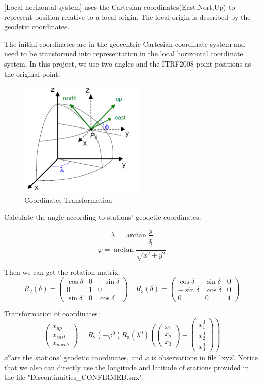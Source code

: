 \documentclass{article}
\begin{document}
[Local horizontal system] uses the Cartesian coordinates(East,Nort,Up) to represent position relative to a local origin. The local origin is described by the geodetic coordinates.

The initial coordinates are in the geocentric Cartesian coordinate system and need to be transformed into representation in the local horizontal coordinate system.
In this project, we use two angles and the ITRF2008 point positions as the original point, 
\begin{figure}[htbp]
  \centering
  \includegraphics[width=6cm]{../source/transform.png}
  \caption{Coordinates Transformation}
  \label{fig:2lhs}
\end{figure}

Calculate the angle according to stations' geodetic coordinates:

$$\lambda=\arctan\frac{y}{x}$$ 
$$\varphi=\arctan\frac{2}{\sqrt{x^{2}+y^{2}}}$$

Then we can get the rotation matrix:
$$R_2(\delta)=\begin{pmatrix}\cos\delta&0&-\sin\delta\\0&1&0\\\sin\delta&0&\cos\delta\end{pmatrix}\quad R_3(\delta)= \begin{pmatrix}\cos\delta&\sin\delta&0\\-\sin\delta&\cos\delta&0\\0&0&1\end{pmatrix}$$

Transformation of coordinates:
$$\left.\begin{pmatrix}x_{up}\\x_{east}\\x_{north}\end{pmatrix}=R_2(-\varphi^0)R_3(\lambda^0)\left(\begin{pmatrix}x_1\\x_2\\x_3\end{pmatrix}\right.-\begin{pmatrix}x_1^0\\x_2^0\\x_3^0\end{pmatrix}\right)$$
$x^0$are the stations' geodetic coordinates, and $x$ is observations in file '.xyz'.
Notice that we also can directly use the longitude and latitude of stations provided in the file "Discontinuities\_CONFIRMED.snx".
\end{document}

